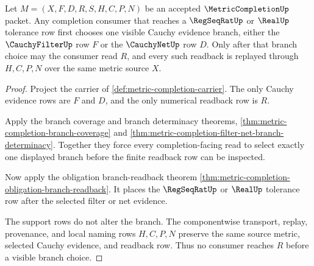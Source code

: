 \begin{theorem}
\label{thm:metric-completion-regular-cauchy-readback}
Let $M=(X,F,D,R,S,H,C,P,N)$ be an accepted $\MetricCompletionUp$ packet. Any completion consumer that reaches a $\RegSeqRatUp$ or $\RealUp$ tolerance row first chooses one visible Cauchy evidence branch, either the $\CauchyFilterUp$ row $F$ or the $\CauchyNetUp$ row $D$. Only after that branch choice may the consumer read $R$, and every such readback is replayed through $H,C,P,N$ over the same metric source $X$.
\end{theorem}
\begin{proof}
Project the carrier of \autoref{def:metric-completion-carrier}. The only Cauchy evidence rows are $F$ and $D$, and the only numerical readback row is $R$.

Apply the branch coverage and branch determinacy theorems, \autoref{thm:metric-completion-branch-coverage} and \autoref{thm:metric-completion-filter-net-branch-determinacy}. Together they force every completion-facing read to select exactly one displayed branch before the finite readback row can be inspected.

Now apply the obligation branch-readback theorem \autoref{thm:metric-completion-obligation-branch-readback}. It places the $\RegSeqRatUp$ or $\RealUp$ tolerance row after the selected filter or net evidence.

The support rows do not alter the branch. The componentwise transport, replay, provenance, and local naming rows $H,C,P,N$ preserve the same source metric, selected Cauchy evidence, and readback row. Thus no consumer reaches $R$ before a visible branch choice.
\end{proof}

